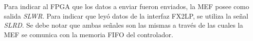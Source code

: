 	Para indicar al FPGA que los datos a enviar fueron enviados, la MEF posee como salida \textit{SLWR}. Para indicar que leyó datos de la interfaz FX2LP, se utiliza la señal \textit{SLRD}. Se debe notar que ambas señales son las mismas a través de las cuales la MEF se comunica con la memoria FIFO del controlador.
	


	
	
	
